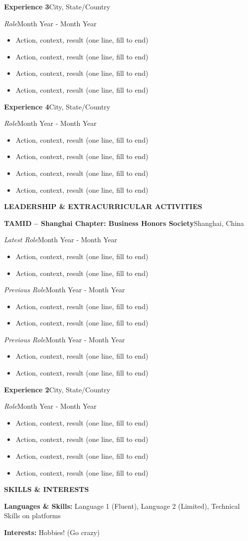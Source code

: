 \documentclass[letterpaper]{article}
\newcommand{\bmin}{\par\vspace{-2pt}}
\newcommand{\bplus}{\par\vspace{2pt}}
\newcommand{\head}[1]{\par\vspace{4pt}\textbf{#1}\par}
\newcommand{\entry}[2]{\par\textbf{#1}\hfill #2\par}
\newcommand{\entryit}[2]{\par\textit{#1}\hfill #2\par}
\newenvironment{bull}{\begin{itemize}[leftmargin=13.6pt, itemsep=0pt, topsep=0pt, parsep=0pt, partopsep=0pt, label=\textbullet\,]}{\end{itemize}}
\begin{document}
\bmin
\entry{Experience 3}{City, State/Country}
\entryit{Role}{Month Year - Month Year}
\begin{bull}
  \item Action, context, result (one line, fill to end)
  \bplus
  \item Action, context, result (one line, fill to end)
  \item Action, context, result (one line, fill to end)
  \bplus
  \item Action, context, result (one line, fill to end)
\end{bull}

\entry{Experience 4}{City, State/Country}
\bmin
\entryit{Role}{Month Year - Month Year}
\begin{bull}
  \item Action, context, result (one line, fill to end)
  \bplus
  \item Action, context, result (one line, fill to end)
  \item Action, context, result (one line, fill to end)
  \bplus
  \item Action, context, result (one line, fill to end)
\end{bull}

\head{\textbf{LEADERSHIP \& EXTRACURRICULAR ACTIVITIES}}
\bplus
\entry{TAMID -- Shanghai Chapter: Business Honors Society}{Shanghai, China}
\entryit{Latest Role}{Month Year - Month Year}
\begin{bull}
  \item Action, context, result (one line, fill to end)
  \item Action, context, result (one line, fill to end)
\end{bull}
\entryit{Previous Role}{Month Year - Month Year}
\begin{bull}
  \item Action, context, result (one line, fill to end)
  \bplus
  \item Action, context, result (one line, fill to end)
\end{bull}
\entryit{Previous Role}{Month Year - Month Year}
\begin{bull}
  \item Action, context, result (one line, fill to end)
  \item Action, context, result (one line, fill to end)
\end{bull}

\entry{Experience 2}{City, State/Country}
\entryit{Role}{Month Year - Month Year}
\begin{bull}
  \item Action, context, result (one line, fill to end)
  \bplus
  \item Action, context, result (one line, fill to end)
  \item Action, context, result (one line, fill to end)
  \bplus
  \item Action, context, result (one line, fill to end)
\end{bull}

\head{\textbf{SKILLS \& INTERESTS}}
\par\textbf{Languages \& Skills:} Language 1 (Fluent), Language 2 (Limited), Technical Skills on platforms\par
\par\textbf{Interests:} Hobbies! (Go crazy)\par
\end{document}
